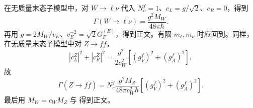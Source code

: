 \begin{derivation}
在无质量末态子模型中，对 $W\to\ell\nu$ 代入 $N_c^f=1$、$c_L=g/\sqrt2$、$c_R=0$，得到
\begin{equation*}
 \Gamma(W\to\ell\nu)=\frac{g^2M_W}{48\pi\hbar}.
\end{equation*}
再用 $g=2M_W/v_E$、$v_E^{-2}=\sqrt2G_F^{(E)}$，得到正文。有限 $m_\ell,m_\nu$ 时应回到。同样，在无质量末态子模型中对 $Z\to f\bar f$，
\begin{equation*}
 |c_L^Z|^2+|c_R^Z|^2
 =\frac{g^2}{2c_W^2}\left[(g_V^f)^2+(g_A^f)^2\right],
\end{equation*}
故
\begin{equation*}
 \Gamma(Z\to f\bar f)
 =N_c^f\frac{g^2M_Z}{48\pi c_W^2\hbar}
 \left[(g_V^f)^2+(g_A^f)^2\right].
\end{equation*}
最后用 $M_W=c_WM_Z$ 与 得到正文。
\end{derivation}
